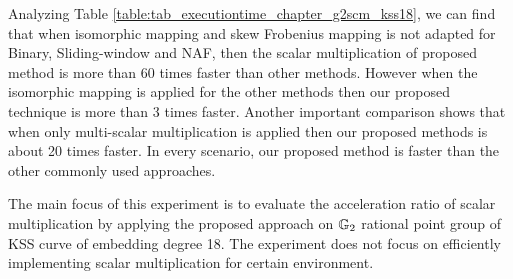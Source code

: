 \renewcommand{\baselinestretch}{1.5}
\begin{table}[!ht]
\centering
\caption{Comparison of execution time in [ms] for scalar multiplication in KSS-18 curve.}
\label{table:tab_executiontime_chapter_g2scm_kss18}
\end{table}
\renewcommand{\baselinestretch}{1.0}

Analyzing  Table \ref{table:tab_executiontime_chapter_g2scm_kss18}, we can find that when isomorphic mapping  and skew Frobenius mapping is not adapted for  Binary, Sliding-window and NAF, then the scalar multiplication of  proposed method is more than 60 times faster than other methods. However when the isomorphic mapping  is applied for the other methods then our proposed technique is more than 3 times faster. Another important comparison shows that when only multi-scalar multiplication is applied then our proposed methods is about 20 times faster. 
In every scenario, our proposed method is faster than the other commonly used approaches.


The main focus of this experiment is to evaluate the  acceleration ratio of scalar multiplication by applying the proposed approach on ${\mathbb{G}}_{2}$ rational point group of  KSS curve of embedding degree 18. The experiment does not focus on efficiently implementing scalar multiplication for certain environment. 


